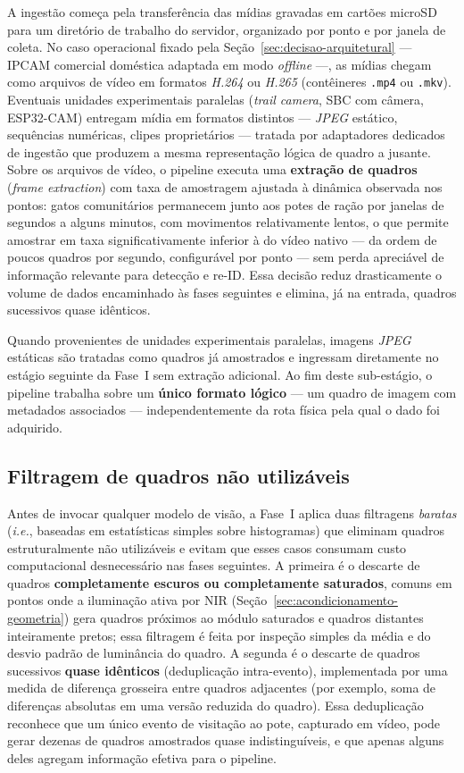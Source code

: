 A ingestão começa pela transferência das mídias gravadas em cartões microSD para um diretório de trabalho do servidor, organizado por ponto e por janela de coleta. No caso operacional fixado pela Seção~\ref{sec:decisao-arquitetural} --- IPCAM comercial doméstica adaptada em modo \emph{offline} ---, as mídias chegam como arquivos de vídeo em formatos \emph{H.264} ou \emph{H.265} (contêineres \texttt{.mp4} ou \texttt{.mkv}). Eventuais unidades experimentais paralelas (\emph{trail camera}, SBC com câmera, ESP32-CAM) entregam mídia em formatos distintos --- \emph{JPEG} estático, sequências numéricas, clipes proprietários --- tratada por adaptadores dedicados de ingestão que produzem a mesma representação lógica de quadro a jusante. Sobre os arquivos de vídeo, o pipeline executa uma \textbf{extração de quadros} (\emph{frame extraction}) com taxa de amostragem ajustada à dinâmica observada nos pontos: gatos comunitários permanecem junto aos potes de ração por janelas de segundos a alguns minutos, com movimentos relativamente lentos, o que permite amostrar em taxa significativamente inferior à do vídeo nativo --- da ordem de poucos quadros por segundo, configurável por ponto --- sem perda apreciável de informação relevante para detecção e re-ID. Essa decisão reduz drasticamente o volume de dados encaminhado às fases seguintes e elimina, já na entrada, quadros sucessivos quase idênticos.

Quando provenientes de unidades experimentais paralelas, imagens \emph{JPEG} estáticas são tratadas como quadros já amostrados e ingressam diretamente no estágio seguinte da Fase~I sem extração adicional. Ao fim deste sub-estágio, o pipeline trabalha sobre um \textbf{único formato lógico} --- um quadro de imagem com metadados associados --- independentemente da rota física pela qual o dado foi adquirido.

\subsection*{Filtragem de quadros não utilizáveis}

Antes de invocar qualquer modelo de visão, a Fase~I aplica duas filtragens \emph{baratas} (\emph{i.e.}, baseadas em estatísticas simples sobre histogramas) que eliminam quadros estruturalmente não utilizáveis e evitam que esses casos consumam custo computacional desnecessário nas fases seguintes. A primeira é o descarte de quadros \textbf{completamente escuros ou completamente saturados}, comuns em pontos onde a iluminação ativa por NIR (Seção~\ref{sec:acondicionamento-geometria}) gera quadros próximos ao módulo saturados e quadros distantes inteiramente pretos; essa filtragem é feita por inspeção simples da média e do desvio padrão de luminância do quadro. A segunda é o descarte de quadros sucessivos \textbf{quase idênticos} (deduplicação intra-evento), implementada por uma medida de diferença grosseira entre quadros adjacentes (por exemplo, soma de diferenças absolutas em uma versão reduzida do quadro). Essa deduplicação reconhece que um único evento de visitação ao pote, capturado em vídeo, pode gerar dezenas de quadros amostrados quase indistinguíveis, e que apenas alguns deles agregam informação efetiva para o pipeline.

